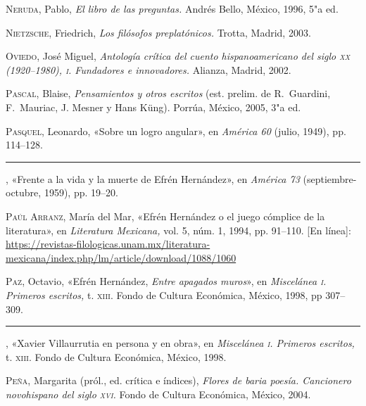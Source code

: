 \documentclass[14pt,twoside,final]{extbook} %
\begin{document}
\textsc{Neruda}, Pablo, \emph{El libro de las preguntas.} Andrés Bello, México, 1996, 5"a ed.\label{bib:neruda1996}

\textsc{Nietzsche}, Friedrich, \emph{Los filósofos preplatónicos.} Trotta, Madrid, 2003.\label{bib:nietzche2003}

\textsc{Oviedo}, José Miguel, \emph{Antología crítica del cuento hispanoamericano del siglo \textsc{xx} (1920--1980), \textsc{i}. Fundadores e innovadores.} Alianza, Madrid, 2002.\label{bib:oviedo2002}

\textsc{Pascal}, Blaise, \emph{Pensamientos y otros escritos} (est. prelim. de R.~Guardini, F.~Mauriac, J. Mesner y Hans Küng). Porrúa, México, 2005, 3"a ed.\label{bib:pascal2005}

\textsc{Pasquel}, Leonardo, «Sobre un logro angular», en \emph{América 60} (julio, 1949), pp. 114--128.\label{bib:pasquel1949}

\rule{1cm}{0.4pt}, «Frente a la vida y la muerte de Efrén Hernández», en \emph{América 73} (septiembre-octubre, 1959), pp. 19--20.\label{bib:pasquel1959}

\textsc{Paúl Arranz}, María del Mar, «Efrén Hernández o el juego cómplice de la literatura», en \emph{Literatura Mexicana,} vol. 5, núm. 1, 1994, pp. 91--110. [En línea]: \url{https://revistas-filologicas.unam.mx/literatura-mexicana/index.php/lm/article/download/1088/1060}\label{bib:paul1994}

\textsc{Paz}, Octavio, «Efrén Hernández, \emph{Entre apagados muros}», en \emph{Miscelánea \textsc{i}. Primeros escritos,} t. \textsc{xiii}. Fondo de Cultura Económica, México, 1998, pp 307--309.\label{bib:paz1998a}

\rule{1cm}{0.4pt}, «Xavier Villaurrutia en persona y en obra», en \emph{Miscelánea \textsc{i}. Primeros escritos,} t. \textsc{xiii}. Fondo de Cultura Económica, México, 1998.\label{bib:paz1998b}

\textsc{Peña}, Margarita (pról., ed. crítica e índices), \emph{Flores de baria poesía. Cancionero novohispano del siglo \textsc{xvi}.} Fondo de Cultura Económica, México, 2004.\label{bib:peña2004}
\end{document}
